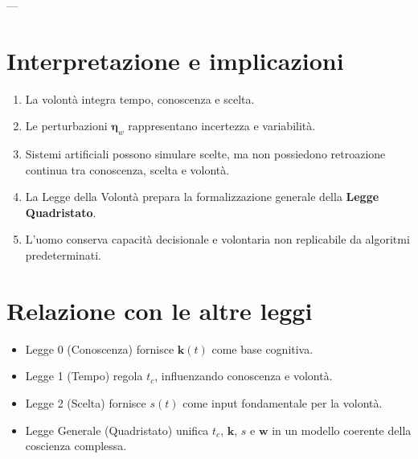 \documentclass[12pt,a4paper]{article}
\begin{document}
\caption*{Lo spazio tridimensionale rappresenta la volontà $\bm{w}$ come funzione di conoscenza $\|\bm{k}\|$, scelta $s$ e fattori esterni $F$. La traiettoria viola mostra l’evoluzione concettuale della volontà verso l’equilibrio, la nuvola grigia rappresenta fluttuazioni esterne.}

---

\section{Interpretazione e implicazioni}

\begin{enumerate}
    \item La volontà integra tempo, conoscenza e scelta.
    \item Le perturbazioni $\bm{\eta}_w$ rappresentano incertezza e variabilità.
    \item Sistemi artificiali possono simulare scelte, ma non possiedono retroazione continua tra conoscenza, scelta e volontà.
    \item La Legge della Volontà prepara la formalizzazione generale della \textbf{Legge Quadristato}.
    \item L’uomo conserva capacità decisionale e volontaria non replicabile da algoritmi predeterminati.
\end{enumerate}

\section{Relazione con le altre leggi}

\begin{itemize}
    \item Legge 0 (Conoscenza) fornisce $\bm{k}(t)$ come base cognitiva.
    \item Legge 1 (Tempo) regola $t_c$, influenzando conoscenza e volontà.
    \item Legge 2 (Scelta) fornisce $s(t)$ come input fondamentale per la volontà.
    \item Legge Generale (Quadristato) unifica $t_c$, $\bm{k}$, $s$ e $\bm{w}$ in un modello coerente della coscienza complessa.
\end{itemize}
\end{document}
